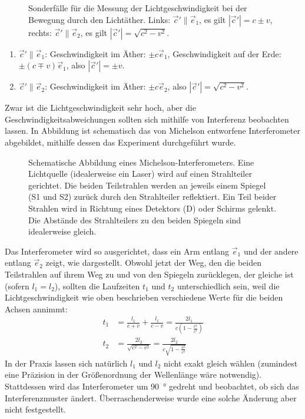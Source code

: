 \begin{figure}[htp]
    \centering
    \tfigMeasurementDirections
    \caption{Sonderfälle für die Messung der Lichtgeschwindigkeit bei der Bewegung durch den Lichtäther. Links: $\vec c'\parallel\vec e_1$, es gilt $|\vec c'|=c\pm v$, rechts: $\vec c'\parallel \vec e_2$, es gilt $|\vec c'|=\sqrt{c^2-v^2}$.}
    \label{fig:bewegung_durch_lichtaetherB}
\end{figure}

\begin{enumerate}
    \item $\vec c'\parallel \vec e_1$: Geschwindigkeit im Äther: $\pm c \vec e_1$, Geschwindigkeit auf der Erde: $\pm(c\mp v)\vec e_1$, also $|\vec c'|=\pm v$.
    \item $\vec c'\parallel \vec e_2$: Geschwindigkeit im Äther: $\pm c \vec e_2$, also $|\vec c'|=\sqrt{c^2-v^2}$.
\end{enumerate}


Zwar ist die Lichtgeschwindigkeit sehr hoch, aber die Geschwindigkeitsabweichungen sollten sich mithilfe von Interferenz beobachten lassen. In Abbildung  ist schematisch das von Michelson entworfene Interferometer abgebildet, mithilfe dessen das Experiment durchgeführt wurde.

\begin{figure}[htb]
    \centering
    \tfigMichelsonInterferometer
    \caption{Schematische Abbildung eines Michelson-Interferometers. Eine Lichtquelle (idealerweise ein Laser) wird auf einen Strahlteiler gerichtet. Die beiden Teilstrahlen werden an jeweils einem Spiegel (S1 und S2) zurück durch den Strahlteiler reflektiert. Ein Teil beider Strahlen wird in Richtung eines Detektors (D) oder Schirms gelenkt. Die Abstände des Strahlteilers zu den beiden Spiegeln sind idealerweise gleich. }
    \label{fig:michelson_interferometer}
\end{figure}

Das Interferometer wird so ausgerichtet, dass ein Arm entlang $\vec e_1$ und der andere entlang $\vec e_2$ zeigt, wie dargestellt.
Obwohl jetzt der Weg, den die beiden Teilstrahlen auf ihrem Weg zu und von den Spiegeln zurücklegen, der gleiche ist (sofern $l_1=l_2$), sollten die Laufzeiten $t_1$ und $t_2$ unterschiedlich sein, weil die Lichtgeschwindigkeit wie oben beschrieben verschiedene Werte für die beiden Achsen annimmt:
\begin{align*}
    t_1 & = \frac{l_1}{c+v}+\frac{l_1}{c-v}=\frac{2l_1}{c\left(1-\frac{v^2}{c^2}\right)} \\
    t_2 & = \frac{2l_2}{\sqrt{c^2-v^2}} = \frac{2l_2}{c\sqrt{1-\frac{v^2}{c^2}}}
\end{align*}
In der Praxis lassen sich natürlich $l_1$ und $l_2$ nicht exakt gleich wählen (zumindest eine Präzision in der Größenordnung der Wellenlänge wäre notwendig). Stattdessen wird das Interferometer um \SI{90}{\degree} gedreht und beobachtet, ob sich das Interferenzmuster ändert.
Überraschenderweise wurde eine solche Änderung aber nicht festgestellt.


